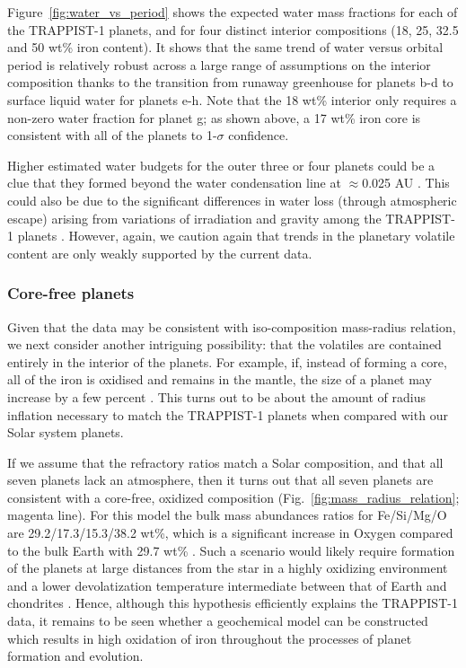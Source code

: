 \documentclass[twocolumn]{aastex63}
\begin{document}
Figure~\ref{fig:water_vs_period} shows the expected water mass fractions for each of the TRAPPIST-1 planets, and for four distinct interior compositions (18, 25, 32.5 and 50 wt\% iron content). It shows that the same trend of water versus orbital period is relatively robust across a large range of assumptions on the interior composition thanks to the transition from runaway greenhouse for planets b-d to surface liquid water for planets e-h.  Note that the 18 wt\% interior only requires a non-zero water fraction for planet g;  as shown above, a 17 wt\% iron core is consistent with all of the planets to 1-$\sigma$ confidence.

Higher estimated water budgets for the outer three or four planets could be a clue that they formed beyond the water condensation line at $\approx$0.025 AU \citep{Unterborn2018a}. This could also be due to the significant differences in water loss (through atmospheric escape) arising from variations of irradiation and gravity among the TRAPPIST-1 planets \citep{Lissauer2007, Bolmont2017,Bourrier2017}.  However, again, we caution again that trends in the planetary volatile content are only weakly supported by the current data.

\subsubsection{Core-free planets} \label{sec:core_free}

Given that the data may be consistent with iso-composition mass-radius relation, we next consider another intriguing possibility:
 that the volatiles are contained entirely in the interior of the planets.  For example, if, instead of forming a core, all of the iron is oxidised and remains in the mantle, the size of a planet may increase by a few percent \citep{ElkinsTanton2008}.  This turns out to be about the amount of radius inflation necessary to match the TRAPPIST-1 planets when compared with our Solar system planets.   
 
 If we assume that the refractory ratios match a Solar composition, and that all seven planets lack an atmosphere, then it turns out that all seven planets are consistent with a core-free, oxidized composition (Fig.\ \ref{fig:mass_radius_relation}; magenta line).  For this model the bulk mass abundances ratios for Fe/Si/Mg/O are 29.2/17.3/15.3/38.2 wt\%, which is a significant increase in Oxygen compared to the bulk Earth with 29.7 wt\% \citep{McDonough2014}.
  Such a scenario would likely require formation of the planets at large distances from the star in a highly oxidizing environment \citep{ElkinsTanton2008} and a lower  devolatization temperature intermediate between that of Earth and chondrites \citep{Wang2019}.  Hence, although this hypothesis efficiently explains the TRAPPIST-1 data, it remains to be seen whether a geochemical model can be constructed which results in high oxidation of iron throughout the processes of planet formation and evolution.
\end{document}
